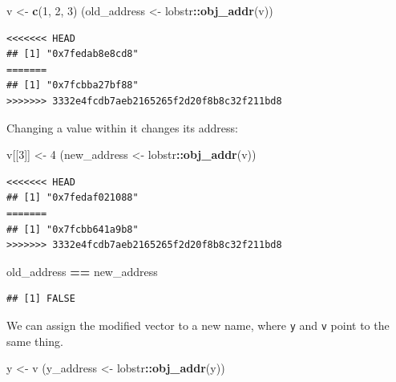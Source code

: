 \documentclass[]{book}
\newenvironment{Shaded}{\begin{snugshade}}{\end{snugshade}}
\newcommand{\DecValTok}[1]{\textcolor[rgb]{0.00,0.00,0.81}{#1}}
\newcommand{\KeywordTok}[1]{\textcolor[rgb]{0.13,0.29,0.53}{\textbf{#1}}}
\newcommand{\NormalTok}[1]{#1}
\newcommand{\OperatorTok}[1]{\textcolor[rgb]{0.81,0.36,0.00}{\textbf{#1}}}
\newcommand{\StringTok}[1]{\textcolor[rgb]{0.31,0.60,0.02}{#1}}
\begin{document}
\begin{Shaded}
\begin{Highlighting}[]
\NormalTok{v <-}\StringTok{ }\KeywordTok{c}\NormalTok{(}\DecValTok{1}\NormalTok{, }\DecValTok{2}\NormalTok{, }\DecValTok{3}\NormalTok{)}
\NormalTok{(old_address <-}\StringTok{ }\NormalTok{lobstr}\OperatorTok{::}\KeywordTok{obj_addr}\NormalTok{(v))}
\end{Highlighting}
\end{Shaded}

\begin{verbatim}
<<<<<<< HEAD
## [1] "0x7fedab8e8cd8"
=======
## [1] "0x7fcbba27bf88"
>>>>>>> 3332e4fcdb7aeb2165265f2d20f8b8c32f211bd8
\end{verbatim}

Changing a value within it changes its address:

\begin{Shaded}
\begin{Highlighting}[]
\NormalTok{v[[}\DecValTok{3}\NormalTok{]] <-}\StringTok{ }\DecValTok{4}
\NormalTok{(new_address <-}\StringTok{ }\NormalTok{lobstr}\OperatorTok{::}\KeywordTok{obj_addr}\NormalTok{(v))}
\end{Highlighting}
\end{Shaded}

\begin{verbatim}
<<<<<<< HEAD
## [1] "0x7fedaf021088"
=======
## [1] "0x7fcbb641a9b8"
>>>>>>> 3332e4fcdb7aeb2165265f2d20f8b8c32f211bd8
\end{verbatim}

\begin{Shaded}
\begin{Highlighting}[]
\NormalTok{old_address }\OperatorTok{==}\StringTok{ }\NormalTok{new_address}
\end{Highlighting}
\end{Shaded}

\begin{verbatim}
## [1] FALSE
\end{verbatim}

We can assign the modified vector to a new name, where \texttt{y} and \texttt{v} point to the same thing.

\begin{Shaded}
\begin{Highlighting}[]
\NormalTok{y <-}\StringTok{ }\NormalTok{v}
\NormalTok{(y_address <-}\StringTok{ }\NormalTok{lobstr}\OperatorTok{::}\KeywordTok{obj_addr}\NormalTok{(y))}
\end{Highlighting}
\end{Shaded}
\end{document}
